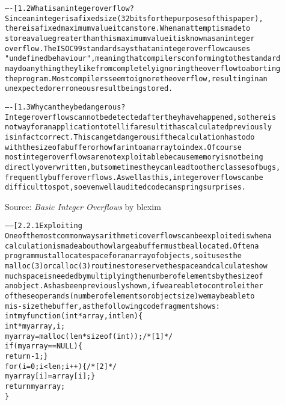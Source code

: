 \documentclass[Screen16to9,17pt]{foils}
\begin{document}
\begin{alltt}\footnotesize
----[ 1.2 What is an integer overflow?
Since an integer is a fixed size (32 bits for the purposes of this paper),
there is a fixed maximum value it can store.  When an attempt is made to
store a value greater than this maximum value it is known as an integer
overflow.  The ISO C99 standard says that an integer overflow causes
"undefined behaviour", meaning that compilers conforming to the standard
may do anything they like from completely ignoring the overflow to aborting
the program.  Most compilers seem to ignore the overflow, resulting in an
unexpected or erroneous result being stored.

----[ 1.3 Why can they be dangerous?
Integer overflows cannot be detected after they have happened, so there is
not way for an application to tell if a result it has calculated previously
is in fact correct.  This can get dangerous if the calculation has to do
with the size of a buffer or how far into an array to index.  Of course
most integer overflows are not exploitable because memory is not being
directly overwritten, but sometimes they can lead to other classes of bugs,
frequently buffer overflows.  As well as this, integer overflows can be
difficult to spot, so even well audited code can spring surprises.
\end{alltt}

Source:
\emph{Basic Integer Overflows} by blexim




\begin{alltt}\footnotesize
------[ 2.2.1 Exploiting
One of the most common ways arithmetic overflows can be exploited is when a
calculation is made about how large a buffer must be allocated.  Often a
program must allocate space for an array of objects, so it uses the
malloc(3) or calloc(3) routines to reserve the space and calculates how
much space is needed by multiplying the number of elements by the size of
an object.  As has been previously shown, if we are able to control either
of these operands (number of elements or object size) we may be able to
mis-size the buffer, as the following code fragment shows:
    int myfunction(int *array, int len)\{
        int *myarray, i;
        myarray = malloc(len * sizeof(int));    /* [1] */
        if(myarray == NULL)\{
            return -1; \}
        for(i = 0; i < len; i++)\{              /* [2] */
            myarray[i] = array[i]; \}
        return myarray;
    \}
  \end{alltt}
\end{document}
